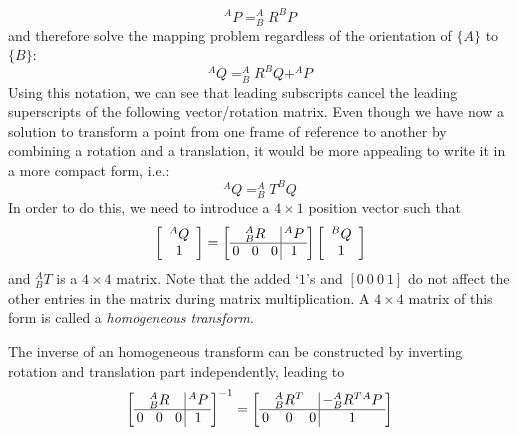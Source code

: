 \begin{equation}
^AP=^A_BR^BP
\end{equation}
%
and therefore solve the mapping problem regardless of the orientation of $\{A\}$ to $\{B\}$:
\begin{equation}
^AQ=^A_BR^BQ+^AP
\end{equation}
Using this notation, we can see that leading subscripts cancel the leading superscripts of the following vector/rotation matrix.
Even though we have now a solution to transform a point from one frame of reference to another by combining a rotation and a translation, it would be more appealing to write it in a more compact form, i.e.:
\begin{equation}
^AQ=^A_BT^BQ
\end{equation}
In order to do this, we need to introduce a $4\times1$ position vector such that
\begin{equation}
\left[\begin{array}{c}^AQ\\1\end{array}\right]=\left[\arraycolsep=2pt\begin{array}{ccc|c} & ^A_BR & & ^AP \\\hline 0 & 0 & 0 & 1\end{array}\right]\left[\begin{array}{c}^BQ\\1\end{array}\right]
\end{equation}
and $^A_BT$ is a $4\times4$ matrix.  Note that the added `$1$'s and $ [0\ 0\ 0\ 1]$ do not affect the other entries in the matrix during matrix multiplication. A $4\times4$ matrix of this form is called a \textsl{homogeneous transform}.

The inverse of an homogeneous transform can be constructed by inverting rotation and translation part independently, leading to
\begin{equation}
\left[\arraycolsep=2pt\begin{array}{ccc|c} & ^A_BR & & ^AP \\\hline 0 & 0 & 0 & 1\end{array}\right]^{-1}=
\left[\arraycolsep=2pt\begin{array}{ccc|c} & ^A_BR^T & & -^A_B{R^T}{^AP} \\\hline 0 & 0 & 0 & 1\end{array}\right]
\end{equation}

